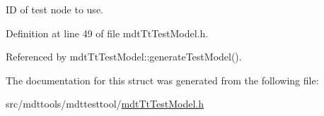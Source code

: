 I\-D of test node to use. 



Definition at line 49 of file mdt\-Tt\-Test\-Model.\-h.



Referenced by mdt\-Tt\-Test\-Model\-::generate\-Test\-Model().



The documentation for this struct was generated from the following file\-:\begin{DoxyCompactItemize}
\item 
src/mdttools/mdttesttool/\hyperlink{mdt_tt_test_model_8h}{mdt\-Tt\-Test\-Model.\-h}\end{DoxyCompactItemize}
